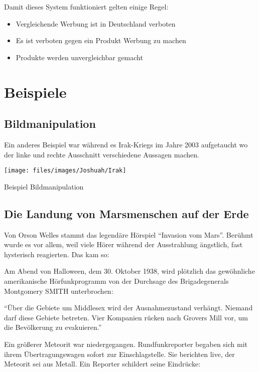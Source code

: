 Damit dieses System funktioniert gelten einige Regel:
\begin{itemize}
	\item Vergleichende Werbung ist in Deutschland verboten
	\item Es ist verboten gegen ein Produkt Werbung zu machen
	\item Produkte werden unvergleichbar gemacht
\end{itemize}


\newpage
\section{Beispiele}
\subsection{Bildmanipulation}
Ein anderes Beispiel war während es Irak-Kriegs im Jahre 2003 aufgetaucht wo der linke und rechte
Ausschnitt verschiedene Aussagen machen.

\begin{figurewrapper}
	\texttt{[image: files/images/Joshuah/Irak]}
	\caption{Beispiel Bildmanipulation}
\end{figurewrapper}


\subsection{Die Landung von Marsmenschen auf der Erde}
Von Orson Welles stammt das legendäre Hörspiel \enquote{Invasion vom Mars}. Berühmt wurde es vor allem, weil
viele Hörer während der Ausstrahlung ängstlich, fast hysterisch reagierten. Das kam so:

Am Abend von Halloween, dem 30. Oktober 1938, wird plötzlich das gewöhnliche amerikanische
Hörfunkprogramm von der Durchsage des Brigadegenerals Montgomery SMITH unterbrochen:

\enquote{Über die Gebiete um Middlesex wird der Ausnahmezustand verhängt. Niemand darf diese Gebiete
betreten. Vier Kompanien rücken nach Grovers Mill vor, um die Bevölkerung zu evakuieren.}

Ein größerer Meteorit war niedergegangen. Rundfunkreporter begaben sich mit ihrem Übertragungswagen
sofort zur Einschlagstelle. Sie berichten live, der Meteorit sei aus Metall. Ein Reporter schildert
seine Eindrücke:

